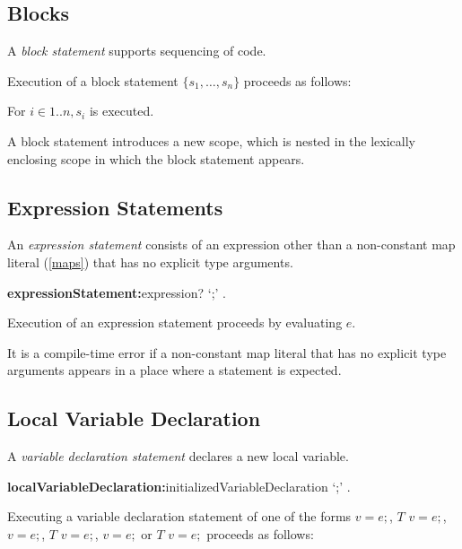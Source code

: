 \documentclass{article}
\begin{document}
\subsection{Blocks}

\LMHash{}
A {\em block statement} supports sequencing of code.

\LMHash{}
Execution of a block statement $\{s_1, \ldots, s_n\}$ proceeds as follows:

\LMHash{}
For $i \in 1 .. n, s_i$ is executed.

\LMHash{}
A block statement introduces a new scope, which is nested in the lexically enclosing scope in which the block statement appears.


\subsection{Expression Statements}

\LMHash{}
An {\em expression statement} consists of an expression other than a non-constant map literal (\ref{maps}) that has no explicit type arguments.


\begin{grammar}
{\bf expressionStatement:}expression? `{\escapegrammar ;}'
  .
\end{grammar}

\LMHash{}
Execution of an expression statement  proceeds by evaluating $e$.

\LMHash{}
It is a compile-time error if a non-constant map literal that has no explicit type arguments appears in a place where a statement is expected.


\subsection{Local Variable Declaration}

\LMHash{}
A {\em variable declaration statement }declares a new local variable.

\begin{grammar}
{\bf localVariableDeclaration:}initializedVariableDeclaration `{\escapegrammar ;}'
  .
\end{grammar}

\LMHash{}
 Executing a variable declaration statement of one of the forms \VAR{} $v = e;$, $T$ $v = e; $, \CONST{} $v = e;$, \CONST{} $T$ $v = e;$, \FINAL{} $v = e;$ or \FINAL{} $T$ $v = e;$ proceeds as follows:
\end{document}
